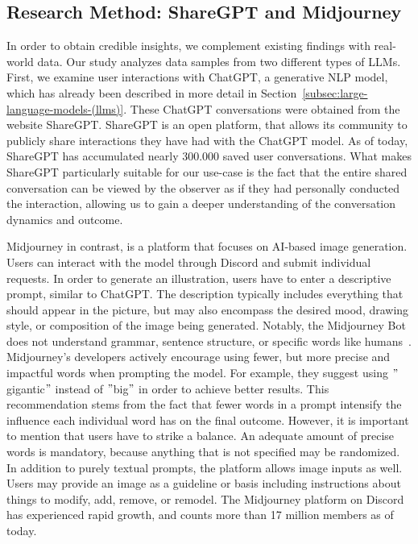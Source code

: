 \subsection{Research Method: ShareGPT and Midjourney}
\label{subsec:research-method:-sharegpt-and-midjourney}
In order to obtain credible insights, we complement existing findings with real-world data.
Our study analyzes data samples from two different types of
LLMs.
First, we examine user interactions with ChatGPT, a generative NLP model, which has already been
described in more detail in Section~\ref{subsec:large-language-models-(llms)}.
These ChatGPT conversations were obtained from the website ShareGPT\cite{sharegpt_sharegpt_2023}.
ShareGPT is an open platform, that allows its community to publicly share interactions they have
had with the ChatGPT model.
As of today, ShareGPT has accumulated nearly 300.000 saved user conversations.
What makes ShareGPT particularly suitable for our use-case is the fact that the entire shared conversation
can be viewed by the observer as if they had personally conducted the interaction, allowing us to
gain a deeper understanding of the conversation dynamics and outcome.
\newline

Midjourney in contrast, is a platform that focuses on AI-based image generation.
Users can interact with the model through Discord\cite{} and submit individual requests. %
In order to generate an illustration, users have to enter a descriptive prompt, similar to
ChatGPT\@.
The description typically includes everything that should appear in the picture, but may also
encompass the desired mood, drawing style, or composition of the image being generated.
Notably, the Midjourney Bot does not understand grammar, sentence structure, or specific words like
humans~\cite{}. %
Midjourney's developers actively encourage using fewer, but more precise and impactful words when
prompting the model.
For example, they suggest using \("\)gigantic\("\) instead of \("\)big\("\) in order to achieve
better results. %
This recommendation stems from the fact that fewer words in a prompt intensify the influence each
individual word has on the final outcome.
However, it is important to mention that users have to strike a balance.
An adequate amount of precise words is mandatory, because anything that is not specified may be
randomized.
In addition to purely textual prompts, the platform allows image inputs as well.
Users may provide an image as a guideline or basis including instructions about things to modify,
add, remove, or remodel.
The Midjourney platform on Discord has experienced rapid growth, and counts more than 17 million
members as of today.
\newline

